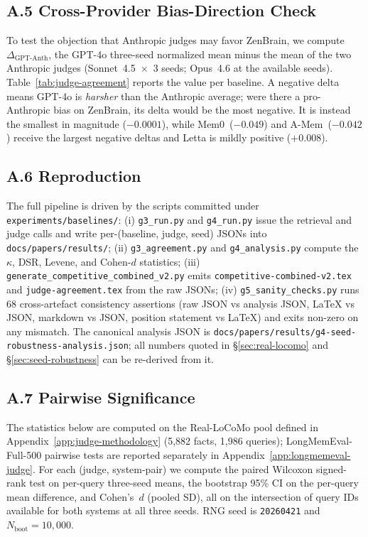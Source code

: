 \documentclass{article}
\begin{document}
\subsection*{A.5 Cross-Provider Bias-Direction Check}

To test the objection that Anthropic judges may favor ZenBrain,
we compute $\Delta_{\text{GPT-Anth}}$, the GPT-4o three-seed
normalized mean minus the mean of the two Anthropic judges
(Sonnet~4.5~$\times$~3 seeds; Opus~4.6 at the available seeds).
Table~\ref{tab:judge-agreement} reports the value per baseline.
A negative delta means GPT-4o is \emph{harsher} than the Anthropic
average; were there a pro-Anthropic bias on ZenBrain, its delta
would be the most negative. It is instead the smallest in
magnitude ($-0.0001$), while Mem0~($-0.049$) and
A-Mem~($-0.042$) receive the largest negative deltas
and Letta is mildly positive ($+0.008$).

\subsection*{A.6 Reproduction}

The full pipeline is driven by the scripts committed under
\texttt{experiments/baselines/}:
(i) \texttt{g3\_run.py} and \texttt{g4\_run.py} issue the retrieval
and judge calls and write per-(baseline, judge, seed) JSONs into
\texttt{docs/papers/results/};
(ii) \texttt{g3\_agreement.py} and \texttt{g4\_analysis.py} compute
the $\kappa$, DSR, Levene, and Cohen-$d$ statistics;
(iii) \texttt{generate\_competitive\_combined\_v2.py} emits
\texttt{competitive-combined-v2.tex} and \texttt{judge-agreement.tex}
from the raw JSONs;
(iv) \texttt{g5\_sanity\_checks.py} runs 68 cross-artefact
consistency assertions (raw JSON vs analysis JSON, LaTeX vs JSON,
markdown vs JSON, position statement vs LaTeX) and exits non-zero
on any mismatch.
The canonical analysis JSON is
\texttt{docs/papers/results/g4-seed-robustness-analysis.json};
all numbers quoted in \S\ref{sec:real-locomo} and
\S\ref{sec:seed-robustness} can be re-derived from it.

\subsection*{A.7 Pairwise Significance}
\label{app:pairwise-significance}

The statistics below are computed on the Real-LoCoMo pool
defined in Appendix~\ref{app:judge-methodology} (5{,}882 facts,
1{,}986 queries); LongMemEval-Full-500 pairwise tests are reported
separately in Appendix~\ref{app:longmemeval-judge}.
For each (judge, system-pair) we compute the paired
Wilcoxon signed-rank test on per-query three-seed means,
the bootstrap 95\% CI on the per-query mean difference,
and Cohen's~$d$ (pooled SD), all on the intersection of
query IDs available for both systems at all three seeds.
RNG seed is \texttt{20260421} and $N_{\text{boot}} = 10{,}000$.
\end{document}
